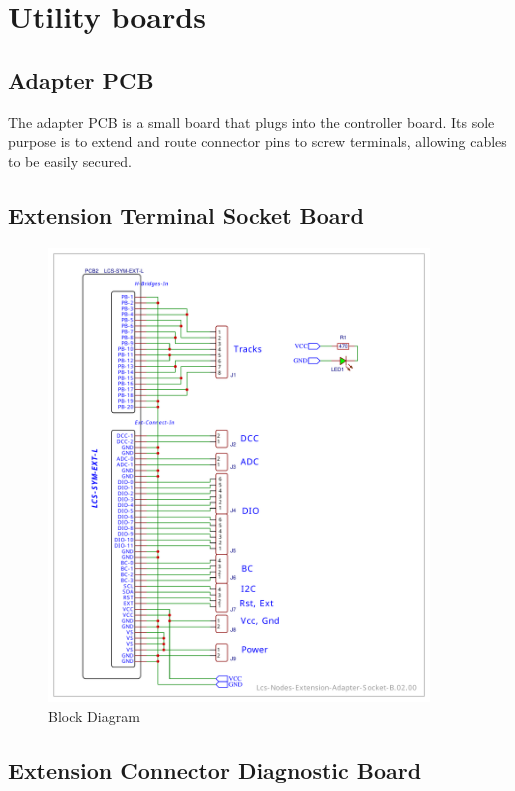 \chapter{Utility boards}

\section{Adapter PCB}

The adapter PCB is a small board that plugs into the controller board. Its sole purpose is to extend and route connector pins to screw terminals, allowing cables to be easily secured.

\section{Extension Terminal Socket Board}

\begin{figure}[htbp]
    \centering
    \includegraphics[page=1, width=0.9\textwidth]{./Schematics/Schematic_LcsNodes-Extension-Adapter-Socket.pdf}
    \caption{Block Diagram}
\end{figure}
\FloatBarrier

\section{Extension Connector Diagnostic Board}


